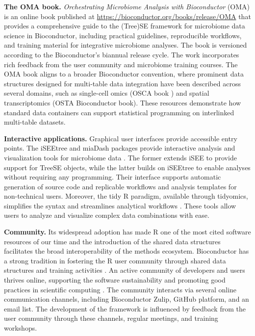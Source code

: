 \documentclass[
  sn-nature,
]{sn-jnl}
\begin{document}
\textbf{The OMA book.} \emph{Orchestrating Microbiome Analysis with
Bioconductor} (OMA) is an online book published at
\url{https://bioconductor.org/books/release/OMA} that provides a
comprehensive guide to the (Tree)SE framework for microbiome data
science in Bioconductor, including practical guidelines, reproducible
workflows, and training material for integrative microbiome analyses.
The book is versioned according to the Bioconductor's biannual release
cycle. The work incorporates rich feedback from the user community and
microbiome training courses. The OMA book aligns to a broader
Bioconductor convention, where prominent data structures
\citep{huber2015, ramos2017, huang2021} designed for multi-table data
integration have been described across several domains, such as
single-cell omics (OSCA book \citep{amezquita2020}) and spatial
transcriptomics (OSTA Bioconductor book). These resources demonstrate
how standard data containers can support statistical programming on
interlinked multi-table datasets.

\textbf{Interactive applications.} Graphical user interfaces provide
accessible entry points. The iSEEtree and miaDash packages provide
interactive analysis and visualization tools for microbiome data
\citep{benedetti2025}. The former extends iSEE to provide support for
TreeSE objects, while the latter builds on iSEEtree to enable analyses
without requiring any programming. Their interface supports automatic
generation of source code and replicable workflows and analysis
templates for non-technical users. Moreover, the tidy R paradigm,
available through tidyomics, simplifies the syntax and streamlines
analytical workflows \citep{hutchison2024}. These tools allow users to
analyze and visualize complex data combinations with ease.

\textbf{Community.} Its widespread adoption has made R one of the most
cited software resources of our time \citep{pearson2025} and the
introduction of the shared data structures facilitates the broad
interoperability of the methods ecosystem. Bioconductor has a strong
tradition in fostering the R user community through shared data
structures and training activities \citep{drnevich2025}. An active
community of developers and users thrives online, supporting the
software sustainability and promoting good practices in scientific
computing \citep{wilson2017}. The community interacts via several online
communication channels, including Bioconductor Zulip, GitHub platform,
and an email list. The development of the framework is influenced by
feedback from the user community through these channels, regular
meetings, and training workshops.
\end{document}
